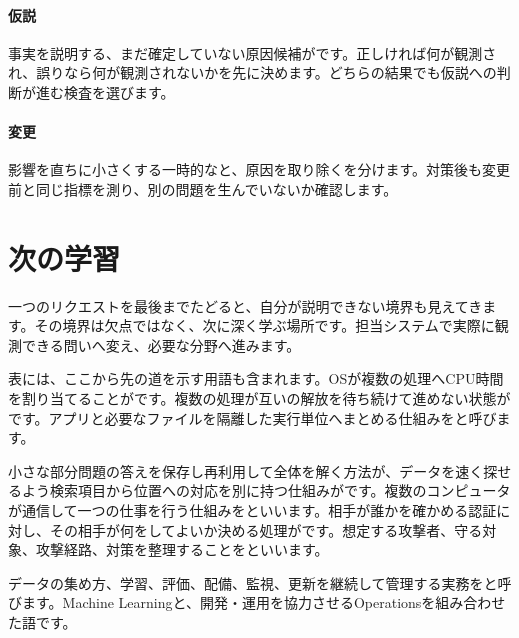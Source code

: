 \par
\endgroup
\medskip
\begingroup
\paragraph{仮説}
        事実を説明する、まだ確定していない原因候補がです。正しければ何が観測され、誤りなら何が観測されないかを先に決めます。どちらの結果でも仮説への判断が進む検査を選びます。

\par
\endgroup
\medskip
\begingroup
\paragraph{変更}
        影響を直ちに小さくする一時的なと、原因を取り除くを分けます。対策後も変更前と同じ指標を測り、別の問題を生んでいないか確認します。

\par
\endgroup
\par
\endgroup


\section{次の学習}
\label{sec:07-practice-14}

一つのリクエストを最後までたどると、自分が説明できない境界も見えてきます。その境界は欠点ではなく、次に深く学ぶ場所です。担当システムで実際に観測できる問いへ変え、必要な分野へ進みます。

表には、ここから先の道を示す用語も含まれます。OSが複数の処理へCPU時間を割り当てることがです。複数の処理が互いの解放を待ち続けて進めない状態がです。アプリと必要なファイルを隔離した実行単位へまとめる仕組みをと呼びます。

小さな部分問題の答えを保存し再利用して全体を解く方法が、データを速く探せるよう検索項目から位置への対応を別に持つ仕組みがです。複数のコンピュータが通信して一つの仕事を行う仕組みをといいます。相手が誰かを確かめる認証に対し、その相手が何をしてよいか決める処理がです。想定する攻撃者、守る対象、攻撃経路、対策を整理することをといいます。

データの集め方、学習、評価、配備、監視、更新を継続して管理する実務をと呼びます。Machine Learningと、開発・運用を協力させるOperationsを組み合わせた語です。

